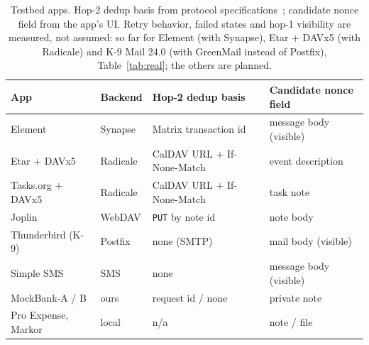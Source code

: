 \begin{table}[!htbp]
\centering
\caption{Testbed apps. Hop-2 dedup basis from protocol specifications~\cite{matrix_spec,rfc4791,rfc9110,rfc5321}; candidate nonce field from the app's UI. Retry behavior,
failed states and hop-1 visibility are measured, not assumed: so far for Element (with Synapse), Etar + DAVx5 (with Radicale) and K-9 Mail 24.0 (with GreenMail instead of
Postfix), Table~\ref{tab:real}; the others are planned.}
\label{tab:apps}
\footnotesize
\setlength{\tabcolsep}{2pt}
\begin{tabular}{@{}lll l@{}}
\toprule
App & Backend & Hop-2 dedup basis & Candidate nonce field \\
\midrule
Element & Synapse & Matrix transaction id & message body (visible) \\
Etar + DAVx5 & Radicale & CalDAV URL + If-None-Match & event description \\
Tasks.org + DAVx5 & Radicale & CalDAV URL + If-None-Match & task note \\
Joplin & WebDAV & \texttt{PUT} by note id & note body \\
Thunderbird (K-9) & Postfix & none (SMTP) & mail body (visible) \\
Simple SMS & SMS & none & message body (visible) \\
MockBank-A / B & ours & request id / none & private note \\
Pro Expense, Markor & local & n/a & note / file \\
\bottomrule
\end{tabular}
\end{table}